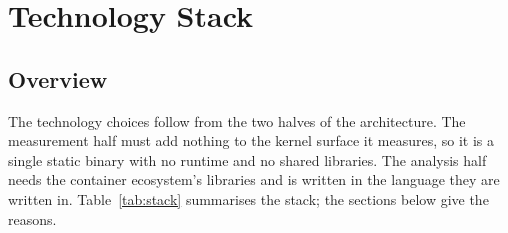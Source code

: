 \chapter{Technology Stack}
\label{ch:techstack}

\section{Overview}

The technology choices follow from the two halves of the architecture. The measurement half must add nothing to the kernel surface it measures, so it is a single static binary with no runtime and no shared libraries. The analysis half needs the container ecosystem's libraries and is written in the language they are written in. Table~\ref{tab:stack} summarises the stack; the sections below give the reasons.

